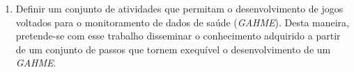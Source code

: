 \begin{enumerate}
\item{Definir um conjunto de atividades que permitam o desenvolvimento de jogos voltados para o monitoramento de dados de saúde (\textit{GAHME}). Desta maneira, pretende-se com esse trabalho disseminar o conhecimento adquirido a partir de um conjunto de passos que tornem exequível o desenvolvimento de um \textit{GAHME}.}

\end{enumerate}

%
%

